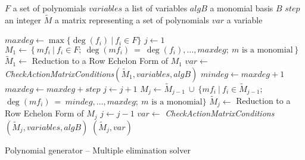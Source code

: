 \begin{algorithm}[ht]
  \begin{algorithmic}[1]
    \Require
      \Statex $F$ a set of polynomials
      \Statex $variables$ a list of variables
      \Statex $algB$ a monomial basis $B$
      \Statex $step$ an integer
    \Ensure
      \Statex $\tilde{M}$ a matrix representing a set of polynomials
      \Statex $var$ a variable
      \Statex

      \State $maxdeg \gets \max\{\deg(f_i)\ |\ f_i \in F\}$
      \State $j \gets 1$
      \State $M_1 \gets \left\{m f_i\ |\ f_i \in F;\ \deg(m f_i)\ =\ \deg(f_i),\dots,maxdeg;\ m \textrm{ is a monomial} \right\}$
      \State $\tilde{M}_1 \gets$ Reduction to a Row Echelon Form of $M_1$
      \State $var \gets$ \textit{CheckActionMatrixConditions}$(\tilde{M}_1, variables, algB)$
        \State $mindeg \gets maxdeg + 1$
        \State $maxdeg \gets maxdeg + step$
        \Repeat
          \State $j \gets j + 1$
	  \State $M_j \gets \tilde{M}_{j-1}\ \cup\ \Big\{m f_i\ |\ f_i \in \tilde{M}_{j-1};$
	  \StatexIndent[4]$\deg(m f_i)\ = \ mindeg,\dots,maxdeg;\ m \textrm{ is a monomial}\Big\}$
          \State $\tilde{M}_j \gets$ Reduction to a Row Echelon Form of $M_j$
        \label{alg:multiElGen:rue}
	\State $j \gets j - 1$\label{alg:multiElGen:shred}
        \State $var \gets$ \textit{CheckActionMatrixConditions}$(\tilde{M}_j, variables, algB)$
      \EndWhile
      \State \Return $(\tilde{M}_j, var)$
  \end{algorithmic}
  \caption{Polynomial generator -- Multiple elimination solver}
  \label{alg:multiElGen}
\end{algorithm}

